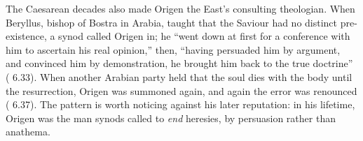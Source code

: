 The Caesarean decades also made Origen the East's consulting theologian.
When Beryllus, bishop of Bostra in Arabia, taught that the Saviour had no
distinct pre-existence, a synod called Origen in; he ``went down at first
for a conference with him to ascertain his real opinion,'' then, ``having
persuaded him by argument, and convinced him by demonstration, he brought
him back to the true doctrine'' ( 6.33). When another
Arabian party held that the soul dies with the body until the resurrection,
Origen was summoned again, and again the error was renounced ( 6.37). The pattern is worth noticing against his later reputation:
in his lifetime, Origen was the man synods called to \emph{end} heresies,
by persuasion rather than anathema.
